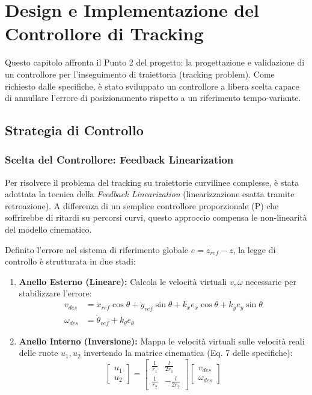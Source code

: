 \chapter{Design e Implementazione del Controllore di Tracking} \label{chap:tracking}
\usetikzlibrary{shapes.geometric, arrows.meta, positioning}

Questo capitolo affronta il Punto 2 del progetto: la progettazione e validazione di un controllore per l'inseguimento di traiettoria (tracking problem). Come richiesto dalle specifiche, è stato sviluppato un controllore a libera scelta capace di annullare l'errore di posizionamento rispetto a un riferimento tempo-variante.

\section{Strategia di Controllo}

\subsection{Scelta del Controllore: Feedback Linearization}
Per risolvere il problema del tracking su traiettorie curvilinee complesse, è stata adottata la tecnica della \textit{Feedback Linearization} (linearizzazione esatta tramite retroazione). A differenza di un semplice controllore proporzionale (P) che soffrirebbe di ritardi su percorsi curvi, questo approccio compensa le non-linearità del modello cinematico.

Definito l'errore nel sistema di riferimento globale \( e = z_{ref} - z \), la legge di controllo è strutturata in due stadi:
\begin{enumerate}
    \item \textbf{Anello Esterno (Lineare):} Calcola le velocità virtuali \( v, \omega \) necessarie per stabilizzare l'errore:
    \begin{align}
        v_{des} &= \dot{x}_{ref}\cos\theta + \dot{y}_{ref}\sin\theta + k_x e_x \cos\theta + k_y e_y \sin\theta \\
        \omega_{des} &= \dot{\theta}_{ref} + k_\theta e_\theta
    \end{align}
    \item \textbf{Anello Interno (Inversione):} Mappa le velocità virtuali sulle velocità reali delle ruote \( u_1, u_2 \) invertendo la matrice cinematica (Eq. 7 delle specifiche):
    \begin{equation}
        \begin{bmatrix} u_1 \\ u_2 \end{bmatrix} = 
        \begin{bmatrix} \frac{1}{r_1} & \frac{l}{2r_1} \\ \frac{1}{r_2} & -\frac{l}{2r_2} \end{bmatrix}
        \begin{bmatrix} v_{des} \\ \omega_{des} \end{bmatrix}
    \end{equation}
\end{enumerate}

